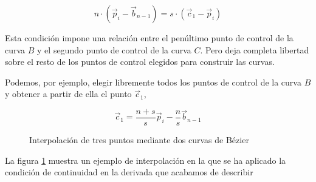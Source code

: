 \begin{equation*}
n\cdot\left(\vec{p}_i-\vec{b}_{n-1}\right) = s\cdot\left(\vec{c}_1-\vec{p}_i\right)
\end{equation*}

Esta condición impone una relación entre el penúltimo punto de control de la curva $B$ y el segundo punto de control de la curva $C$. Pero deja completa libertad sobre el resto de los puntos de control elegidos para construir las curvas.

Podemos, por ejemplo, elegir libremente todos los puntos de control de la curva $B$ y obtener a partir de ella el punto $\vec{c}_1$,

\begin{equation*}
\vec{c}_1 = \frac{n+s}{s}\vec{p}_i - \frac{n}{s}\vec{b}_{n-1}
\end{equation*}

\begin{figure}[h]
\centering
{} \qquad 
{}
\caption{Interpolación de tres puntos mediante dos curvas de Bézier} 
\label{fig:ibz3}
\end{figure}
 

La figura \ref{fig:ibz3} muestra un ejemplo de interpolación en la que se ha aplicado la condición de continuidad en la derivada que acabamos de describir
